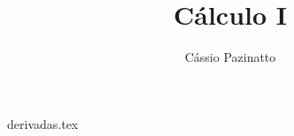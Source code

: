 \documentclass[xcolor=table]{beamer}
\author{Cássio Pazinatto}
\title{Cálculo I}
\begin{document}
  {derivadas.tex}
\end{document}
